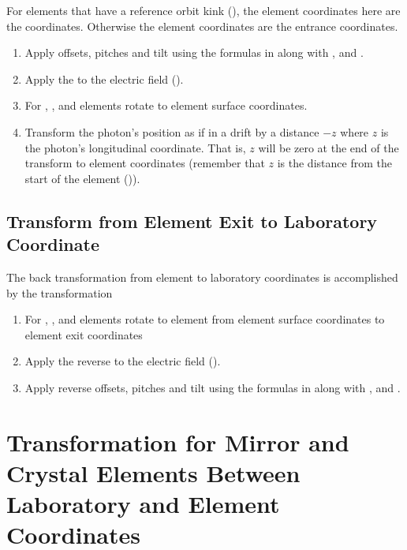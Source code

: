 For elements that have a reference orbit kink
(), the element coordinates here are the
 coordinates. Otherwise the element coordinates are
the entrance coordinates.

  \begin{enumerate}
  \item
Apply offsets, pitches and tilt using the formulas in
 along with , and .
  \item
Apply the  to the electric field ().
  \item
For , , and  elements
rotate to element surface coordinates.
 \item
Transform the photon's position as if in a drift by a distance $-z$
where $z$ is the photon's longitudinal coordinate. That is, $z$ will
be zero at the end of the transform to element coordinates (remember
that $z$ is the distance from the start of the element
()).

\end{enumerate}

\subsection{Transform from Element Exit to Laboratory Coordinate}

The back transformation from element to laboratory coordinates is
accomplished by the transformation
  \begin{enumerate}
  \item
For , , and  elements
rotate to element from element surface coordinates to element exit coordinates
  \item
Apply the reverse  to the electric field ().
  \item
Apply reverse offsets, pitches and tilt using the formulas in
 along with , and .
  \end{enumerate}

\section[Mirror and Crystal Element Transformation]
{Transformation for Mirror and Crystal Elements Between 
Laboratory and Element Coordinates}
\label{s:photon.lab.ele}

